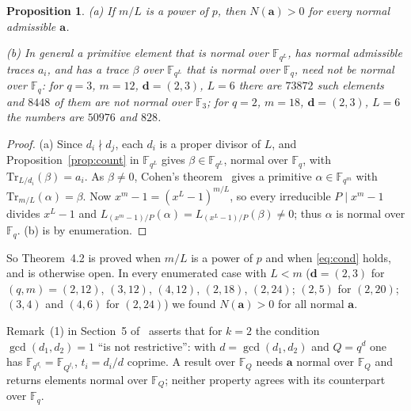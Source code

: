\documentclass[11pt,a4paper]{amsart}
\newtheorem{proposition}[theorem]{Proposition}
\theoremstyle{remark}
\newcommand{\F}{\mathbb{F}}
\newcommand{\Fq}{\mathbb{F}_q}
\newcommand{\Tr}{\mathrm{Tr}}
\newcommand{\bd}{\mathbf{d}}
\newcommand{\ba}{\mathbf{a}}
\newcommand{\MKB}{\cite{MKB}}
\begin{document}
\begin{proposition}\label{prop:lcm}
\textup{(a)} If $m/L$ is a power of $p$, then $N(\ba)>0$ for every normal admissible $\ba$.

\textup{(b)} In general a primitive element that is normal over $\F_{q^{L}}$, has normal admissible traces
$a_i$, and has a trace $\beta$ over $\F_{q^L}$ that is normal over $\Fq$, need not be normal over $\Fq$:
for $q=3$, $m=12$, $\bd=(2,3)$, $L=6$ there are $73872$ such elements and $8448$ of them are not normal over
$\F_3$; for $q=2$, $m=18$, $\bd=(2,3)$, $L=6$ the numbers are $50976$ and $828$.
\end{proposition}
\begin{proof}
(a) Since $d_i\nmid d_j$, each $d_i$ is a proper divisor of $L$, and Proposition~\ref{prop:count} in
$\F_{q^{L}}$ gives $\beta\in\F_{q^{L}}$, normal over $\Fq$, with $\Tr_{L/d_i}(\beta)=a_i$. As $\beta\ne0$,
Cohen's theorem~\cite{C90} gives a primitive $\alpha\in\F_{q^m}$ with $\Tr_{m/L}(\alpha)=\beta$. Now
$x^m-1=(x^{L}-1)^{m/L}$, so every irreducible $P\mid x^m-1$ divides $x^{L}-1$ and
$L_{(x^m-1)/P}(\alpha)=L_{(x^{L}-1)/P}(\beta)\ne0$; thus $\alpha$ is normal over $\Fq$. (b) is by
enumeration.
\end{proof}

So Theorem~4.2 is proved when $m/L$ is a power of $p$ and when \eqref{eq:cond} holds, and is otherwise
open. In every enumerated case with $L<m$ ($\bd=(2,3)$ for $(q,m)=(2,12)$, $(3,12)$, $(4,12)$, $(2,18)$, $(2,24)$; $(2,5)$ for
$(2,20)$; $(3,4)$ and $(4,6)$ for $(2,24)$) we found $N(\ba)>0$ for all normal $\ba$.

Remark~(1) in Section~5 of \MKB\ asserts that for $k=2$ the condition $\gcd(d_1,d_2)=1$ ``is not
restrictive'': with $d=\gcd(d_1,d_2)$ and $Q=q^{d}$ one has $\F_{q^{d_i}}=\F_{Q^{t_i}}$, $t_i=d_i/d$ coprime.
A result over $\F_Q$ needs $\ba$ normal over $\F_Q$ and returns elements normal over $\F_Q$; neither property
agrees with its counterpart over $\Fq$.
\end{document}
